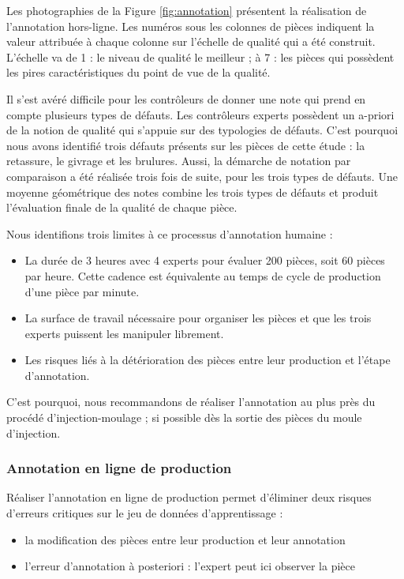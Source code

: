 Les photographies de la Figure \ref{fig:annotation} présentent la réalisation de l'annotation hors-ligne.
Les numéros sous les colonnes de pièces indiquent la valeur attribuée à chaque colonne sur l'échelle de qualité qui a été construit.
L'échelle va de 1 : le niveau de qualité le meilleur ; à 7 : les pièces qui possèdent les pires caractéristiques du point de vue de la qualité.

Il s'est avéré difficile pour les contrôleurs de donner une note qui prend en compte plusieurs types de défauts.
Les contrôleurs experts possèdent un a-priori de la notion de qualité qui s'appuie sur des typologies de défauts.
C'est pourquoi nous avons identifié trois défauts présents sur les pièces de cette étude : la retassure, le givrage et les brulures.
Aussi, la démarche de notation par comparaison a été réalisée trois fois de suite, pour les trois types de défauts.
Une moyenne géométrique des notes combine les trois types de défauts et produit l'évaluation finale de la qualité de chaque pièce.

\noindent
Nous identifions trois limites à ce processus d'annotation humaine :
\begin{itemize}
	\item La durée de 3 heures avec 4 experts pour évaluer 200 pièces, soit 60 pièces par heure. Cette cadence est équivalente au temps de cycle de production d'une pièce par minute.
	\item La surface de travail nécessaire pour organiser les pièces et que les trois experts puissent les manipuler librement.
	\item Les risques liés à la détérioration des pièces entre leur production et l'étape d'annotation.
\end{itemize}
C'est pourquoi, nous recommandons de réaliser l'annotation au plus près du procédé d'injection-moulage ; si possible dès la sortie des pièces du moule d'injection.

\subsubsection{Annotation en ligne de production}
Réaliser l'annotation en ligne de production permet d'éliminer deux risques d'erreurs critiques sur le jeu de données d'apprentissage :
\begin{itemize}
	\item la modification des pièces entre leur production et leur annotation
	\item l'erreur d'annotation à posteriori : l'expert peut ici observer la pièce
\end{itemize}

